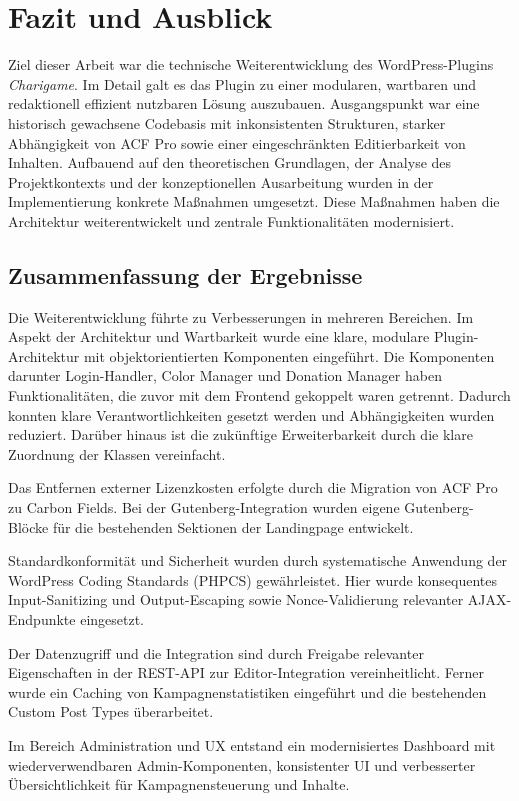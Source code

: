 \chapter{Fazit und Ausblick}
\label{ch:fazit-und-ausblick}

Ziel dieser Arbeit war die technische Weiterentwicklung des WordPress-Plugins \textit{Charigame}.
Im Detail galt es das Plugin zu einer modularen, wartbaren und redaktionell effizient nutzbaren Lösung auszubauen.
Ausgangspunkt war eine historisch gewachsene Codebasis mit inkonsistenten Strukturen, starker Abhängigkeit von ACF Pro sowie einer eingeschränkten Editierbarkeit von Inhalten.
Aufbauend auf den theoretischen Grundlagen, der Analyse des Projektkontexts und der konzeptionellen Ausarbeitung wurden in der Implementierung konkrete Maßnahmen umgesetzt.
Diese Maßnahmen haben die Architektur weiterentwickelt und zentrale Funktionalitäten modernisiert.

\section{Zusammenfassung der Ergebnisse}
Die Weiterentwicklung führte zu Verbesserungen in mehreren Bereichen.
Im Aspekt der Architektur und Wartbarkeit wurde eine klare, modulare Plugin-Architektur mit objektorientierten Komponenten eingeführt.
Die Komponenten darunter Login-Handler, Color Manager und Donation Manager haben Funktionalitäten, die zuvor mit dem Frontend gekoppelt waren getrennt.
Dadurch konnten klare Verantwortlichkeiten gesetzt werden und Abhängigkeiten wurden reduziert.
Darüber hinaus ist die zukünftige Erweiterbarkeit durch die klare Zuordnung der Klassen vereinfacht.

Das Entfernen externer Lizenzkosten erfolgte durch die Migration von ACF Pro zu Carbon Fields.
Bei der Gutenberg-Integration wurden eigene Gutenberg-Blöcke für die bestehenden Sektionen der Landingpage entwickelt.

Standardkonformität und Sicherheit wurden durch systematische Anwendung der WordPress Coding Standards (PHPCS) gewährleistet.
Hier wurde konsequentes Input-Sanitizing und Output-Escaping sowie Nonce-Validierung relevanter AJAX-Endpunkte eingesetzt.

Der Datenzugriff und die Integration sind durch Freigabe relevanter Eigenschaften in der REST-API zur Editor-Integration vereinheitlicht.
Ferner wurde ein Caching von Kampagnenstatistiken eingeführt und die bestehenden Custom Post Types überarbeitet.

Im Bereich Administration und UX entstand ein modernisiertes Dashboard mit wiederverwendbaren Admin-Komponenten, konsistenter UI und verbesserter Übersichtlichkeit für Kampagnensteuerung und Inhalte.

